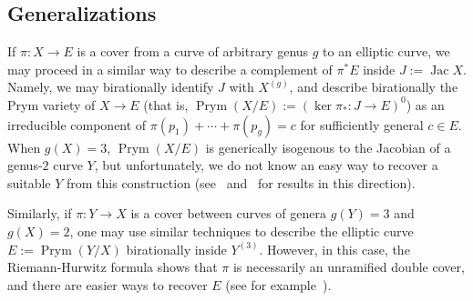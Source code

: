 \documentclass[a4paper,twoside,english]{amsart}
\theoremstyle{plain}
\theoremstyle{definition}
\begin{document}
\subsection{Generalizations} If $\pi : X \to E$ is a cover from a curve of arbitrary genus $g$ to an elliptic curve, we may proceed in a similar way to describe a complement of $\pi^*E$ inside $J:=\operatorname{Jac} X$. Namely, we may birationally identify $J$ with $X^{(g)}$, and describe birationally the Prym variety of $X \to E$ (that is, $\operatorname{Prym}(X/E) := (\ker \pi_* : J \to E)^0$) as an irreducible component of $\pi(p_1) + \cdots + \pi(p_g)=c$ for sufficiently general $c \in E$. When $g(X)=3$, $\operatorname{Prym}(X/E)$ is generically isogenous to the Jacobian of a genus-$2$ curve $Y$, but unfortunately, we do not know an easy way to recover a suitable $Y$ from this construction (see~\cite{MR3781951} and~\cite{MR4574430} for results in this direction).

Similarly, if $\pi : Y \to X$ is a cover between curves of genera $g(Y)=3$ and $g(X)=2$, one may use similar techniques to describe the elliptic curve $E := \operatorname{Prym}(Y/X)$ birationally inside $Y^{(3)}$. However, in this case, the Riemann-Hurwitz formula shows that $\pi$ is necessarily an unramified double cover, and there are easier ways to recover $E$ (see for example~\cite[Proposition 2.2]{MR2406115}).








 


 



 






\end{document}
